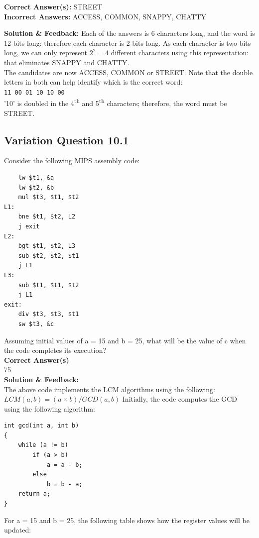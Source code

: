 \textbf{Correct Answer(s):} STREET \\
\textbf{Incorrect Answers:} ACCESS, COMMON, SNAPPY, CHATTY

\textbf{Solution \& Feedback:}
Each of the answers is 6 characters long, and the word is 12-bits long: therefore each character is 2-bits long. As each character is two bits long, we can only represent $2^2 = 4$ different characters using this representation: that eliminates SNAPPY and CHATTY.\\
The candidates are now ACCESS, COMMON or STREET. Note that the double letters in both can help identify which is the correct word:\\
\texttt{11 00 01 10 10 00}\\
'10' is doubled in the 4\textsuperscript{th} and 5\textsuperscript{th} characters; therefore, the word must be STREET.\\

\subsection{Variation Question 10.1}
Consider the following MIPS assembly code:
\begin{lstlisting}
    lw $t1, &a
    lw $t2, &b
    mul $t3, $t1, $t2
L1:
    bne $t1, $t2, L2
    j exit
L2:
    bgt $t1, $t2, L3
    sub $t2, $t2, $t1
    j L1
L3:
    sub $t1, $t1, $t2
    j L1
exit:
    div $t3, $t3, $t1
    sw $t3, &c
\end{lstlisting}
Assuming initial values of a = 15 and b = 25, what will be the value of c when the code completes its execution? \\
\textbf{Correct Answer(s)} \\
75 \\

\textbf{Solution \& Feedback:} \\
The above code implements the LCM algorithms using the following: \\
\(LCM (a, b) = (a \times b) / GCD (a, b) \)
Initially, the code computes the GCD using the following algorithm:

\begin{lstlisting}
int gcd(int a, int b)
{
    while (a != b)
        if (a > b)
            a = a - b;
        else
            b = b - a;
    return a;
}
\end{lstlisting}

For a = 15 and b = 25, the following table shows how the register values will be updated:

